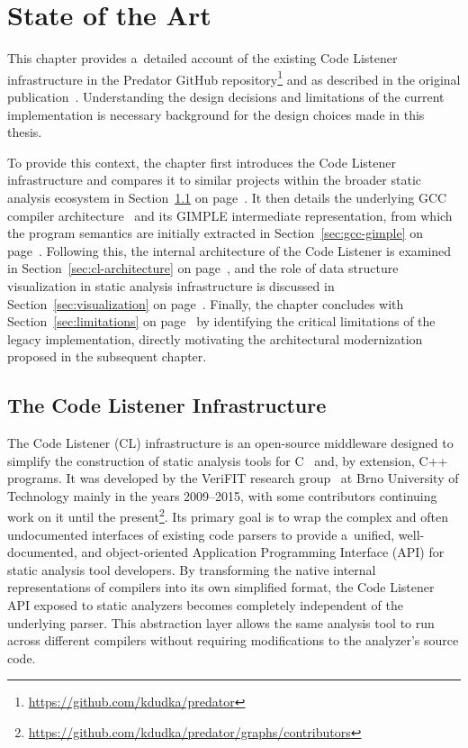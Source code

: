 \documentclass[xpsejal00-gcc-plugin.tex]{subfiles}
\begin{document}
\chapter{State of the Art}\label{chap:sota}

This chapter provides a~detailed account of the existing Code Listener infrastructure in the Predator GitHub repository\footnote{\url{https://github.com/kdudka/predator}} and as described in the original publication~\cite{CodeListener2012}.
Understanding the design decisions and limitations of the current implementation is necessary background for the design choices made in this thesis.

To provide this context, the chapter first introduces the Code Listener infrastructure and compares it to similar projects within the broader static analysis ecosystem in Section~\ref{sec:cl-infrastructure} on page~\pageref{sec:cl-infrastructure}.
It then details the underlying GCC compiler architecture~\cite{GCCInternals} and its GIMPLE intermediate representation, from which the program semantics are initially extracted in Section~\ref{sec:gcc-gimple} on page~\pageref{sec:gcc-gimple}.
Following this, the internal architecture of the Code Listener is examined in Section~\ref{sec:cl-architecture} on page~\pageref{sec:cl-architecture}, and the role of data structure visualization in static analysis infrastructure is discussed in Section~\ref{sec:visualization} on page~\pageref{sec:visualization}.
Finally, the chapter concludes with Section~\ref{sec:limitations} on page~\pageref{sec:limitations} by identifying the critical limitations of the legacy implementation, directly motivating the architectural modernization proposed in the subsequent chapter.

\section{The Code Listener Infrastructure}\label{sec:cl-infrastructure}

The Code Listener (CL) infrastructure is an open-source middleware designed to simplify the construction of static analysis tools for C~\cite{CodeListener2012} and, by extension, C++~\cite{CppExtension2014} programs.
It was developed by the VeriFIT research group~\cite{VeriFIT} at Brno University of Technology mainly in the years 2009--2015, with some contributors continuing work on it until the present\footnote{\url{https://github.com/kdudka/predator/graphs/contributors}}.
Its primary goal is to wrap the complex and often undocumented interfaces of existing code parsers to provide a~unified, well-documented, and object-oriented Application Programming Interface (API) for static analysis tool developers.
By transforming the native internal representations of compilers into its own simplified format, the Code Listener API exposed to static analyzers becomes completely independent of the underlying parser.
This abstraction layer allows the same analysis tool to run across different compilers without requiring modifications to the analyzer's source code.
\end{document}
